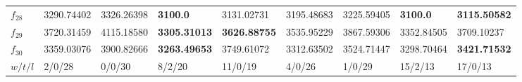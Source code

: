 \begin{table*}[t!]
\begin{tabular}{|p{0.8cm}|p{1.6cm}|p{1.6cm}|p{1.6cm}|p{1.6cm}|p{1.6cm}|p{1.6cm}|p{1.6cm}|p{1.6cm}|}
$f_{28}$  & 3290.74402 & 3326.26398 & \textbf{3100.0} & 3131.02731 & 3195.48683 & 3225.59405 & \textbf{3100.0} & \textbf{3115.50582} \\ 
$f_{29}$  & 3720.31459 & 4115.18580 & \textbf{3305.31013} & \textbf{3626.88755} & 3535.95229 & 3867.59306 & 3352.84505 & 3709.10237 \\ 
$f_{30}$  & 3359.03076 & 3900.82666 & \textbf{3263.49653} & 3749.61072 & 3312.63502 & 3524.71447 & 3298.70464 & \textbf{3421.71532} \\ 
\hline
$w/t/l$  & 2/0/28 & 0/0/30 & 8/2/20 & 11/0/19 & 4/0/26 & 1/0/29 & 15/2/13 & 17/0/13 \\
\hline
\end{tabular}
\end{table*}
\endgroup

